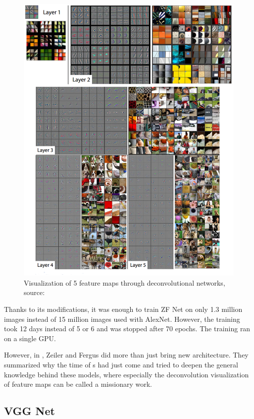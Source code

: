 \begin{figure}[H]
   \centering
	\includegraphics[width=\linewidth]{./pictures/deconvnet.png}
	\caption[Deconvolutional network]{Visualization of 5 feature maps through 
deconvolutional networks, source: \cite{zf-net}}
      \label{fig:deconvnet}
\end{figure}

Thanks to its modifications, it was enough to train ZF Net on only 1.3 million 
images instead of 15 million images used with AlexNet. However, the training 
took 12 days instead of 5 or 6 and was stopped after 70 epochs. The training ran 
on a single GPU.

However, in \cite{zf-net}, Zeiler and Fergus did more than just bring new 
architecture. They summarized why the time of s had just come and tried 
to deepen the general knowledge behind these models, where especially the 
deconvolution visualization of feature maps can be called a missionary work.

\subsection{VGG Net}
\label{vgg}

